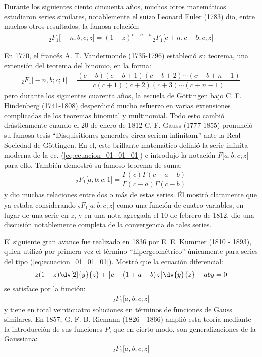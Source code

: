 Durante los siguientes ciento cincuenta años, muchos otros
matemáticos estudiaron series similares, notablemente el suizo Leonard Euler (1783) dio, entre muchos otros resultados, la famosa relación:
\begin{align}
{}_{2} F_{1} \big[ -n, b; c; z \big] = (1 - z)^{c+n-b} \, {}_{2} F_{1} \big[ c + n, c - b; c; z \big]
\label{eq:ecuacion_01_01_03} 
\end{align}

En 1770, el francés A. T. Vandermonde (1735-1796) estableció su teorema, una extensión del teorema del binomio, en la forma:
\begin{align}
{}_{2} F_{1} \big[ -n, b; c; 1 \big] = \dfrac{(c {-} b)(c {-} b {+} 1)(c {-} b {+} 2) \cdots (c {-} b {+} n {-} 1)}{c (c {+} 1)(c {+} 2)(c {+} 3) \cdots (c {+} n {-} 1)}
\label{eq:ecuacion_01_01_04}
\end{align}
pero durante los siguientes cuarenta años, la escuela de Göttingen bajo C. F. Hindenberg (1741-1808) desperdició mucho esfuerzo en varias extensiones complicadas de los teoremas binomial y multinomial. Todo esto cambió drásticamente cuando el 20 de enero de 1812 C. F. Gauss (1777-1855) pronunció su famosa tesis \enquote{Disquisitiones generales circa seriem infinitam} ante la Real Sociedad de Göttingen. En el, este brillante matemático definió la serie infinita moderna de la ec. (\ref{eq:ecuacion_01_01_01}) e introdujo la notación $F \big[a, b; c; z \big]$ para ello. También demostró su famoso teorema de suma:
\begin{align}
{}_{2} F_{1} \big[ a, b; c; 1 \big] = \dfrac{\Gamma (c) \Gamma (c - a - b)}{\Gamma(c - a) \Gamma (c - b)}
\label{eq:ecuacion_01_01_05}
\end{align}
y dio muchas relaciones entre dos o más de estas series. Él
mostró claramente que ya estaba considerando ${}_{2} F_{1} \big[ a, b; c; z \big]$ como una función de cuatro variables, en lugar de una serie en $z$, y en una nota agregada el 10 de febrero de 1812, dio una discusión notablemente completa de la convergencia de tales series.
\par
El siguiente gran avance fue realizado en 1836 por E. E. Kummer (1810 - 1893), quien utilizó por primera vez el término \enquote{hipergeométrico} únicamente para series del tipo (\ref{eq:ecuacion_01_01_01}). Mostró que la ecuación diferencial:
\begin{align}
z (1 - z) \dv[2]{y}{z} + \big[ c - \big( 1 + a + b \big) z \big] \dv{y}{z} - a b y = 0
\label{eq:ecuacion_01_01_06}
\end{align}
se satisface por la función:
\begin{align*}
{}_{2} F_{1} \big[ a, b; c; z \big]
\end{align*}
y tiene en total veinticuatro soluciones en términos de funciones de Gauss similares. En 1857, G. F. B. Riemann (1826 - 1866) amplió esta teoría mediante la introducción de sus funciones $P$, que en cierto modo, son generalizaciones de la Gaussiana:
\begin{align*}
{}_{2} F_{1} \big[ a, b; c; z \big]
\end{align*}    

